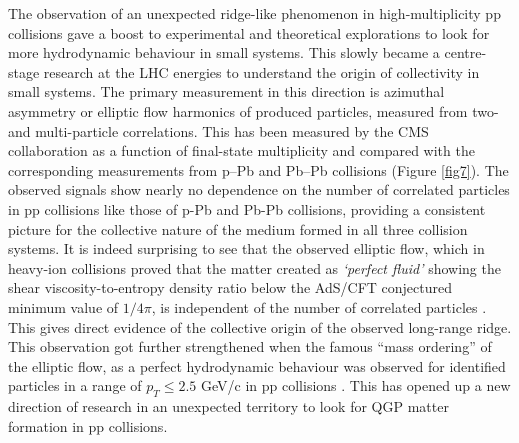 \documentclass[showpacs,showkeys,aps,twocolumn]{revtex4}
\newcommand\+{\dagger}
\begin{document}
The observation of an unexpected ridge-like phenomenon in high-multiplicity pp collisions gave a boost to experimental and theoretical explorations to look for more hydrodynamic behaviour in small systems. This slowly became a centre-stage research at the LHC energies to understand the origin of collectivity in small systems. The primary measurement in this direction is azimuthal asymmetry or elliptic flow harmonics of produced particles, measured from two- and multi-particle correlations. This has been measured by the CMS collaboration \cite{Ref27} 
as a function of final-state multiplicity and compared with the corresponding measurements from p–Pb and Pb–Pb collisions (Figure \ref{fig7}). The observed signals show nearly no dependence on the number of correlated particles in pp collisions like those of p-Pb and Pb-Pb collisions, providing a consistent picture for the collective nature of the medium formed in all three collision systems. It is indeed surprising to see that the observed elliptic flow, which in heavy-ion collisions proved that the matter created as {\it `perfect fluid’} showing the shear viscosity-to-entropy density ratio below the AdS/CFT conjectured minimum value of $1/4\pi$, is independent of the number of correlated particles \cite{Ref28}. This gives direct evidence of the collective origin of the observed long-range ridge. This observation got further strengthened when the famous “mass ordering” of the elliptic flow, as a perfect hydrodynamic behaviour was observed for identified particles in a range of $p_T \leq 2.5$ GeV/c in pp collisions \cite{Ref28}.  This has opened up a new direction of research in an unexpected territory to look for QGP matter formation in pp collisions.
\end{document}
